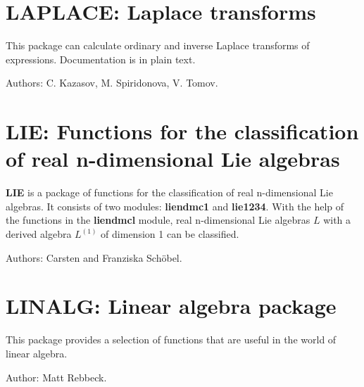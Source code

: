\newpage

\section{LAPLACE: Laplace transforms}

This package can calculate ordinary and inverse Laplace transforms of
expressions.  Documentation is in plain text.

Authors: C. Kazasov, M. Spiridonova, V. Tomov.



\newpage

\section{LIE: Functions for the classification of real n-dimensional Lie
algebras}

{\bf LIE} is a package of functions for the classification of real
n-dimensional Lie algebras.  It consists of two modules: {\bf liendmc1}
and {\bf lie1234}.  With the help of the functions in the {\bf liendmcl}
module, real n-dimensional Lie algebras $L$ with a derived algebra
$L^{(1)}$ of dimension 1 can be classified.

Authors: Carsten and Franziska Sch\"obel.



\newpage

\iffalse
\section{LIMITS: A package for finding limits}
\indexpackage{LIMITS}


This package loads automatically.

Author: Stanley L. Kameny.


\fi

\newpage

\section{LINALG: Linear algebra package}
\label{LINALG}

This package provides a selection of functions that are useful
in the world of linear algebra.

Author: Matt Rebbeck.



\newpage

